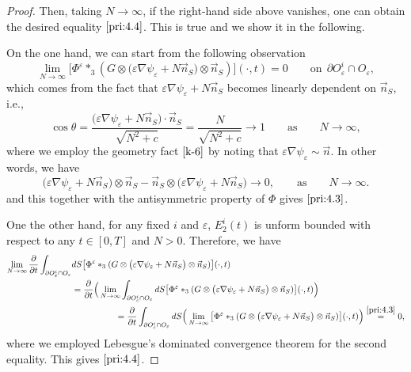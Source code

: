 \documentclass[13pt,CJK]{article}
\theoremstyle{plain}                       %
\theoremstyle{remark}
\numberwithin{equation}{section}
\begin{document}
\begin{proof}
Then, taking $N\to\infty$,
if the right-hand side above vanishes, one can obtain
the desired equality $\eqref{pri:4.4}$. This is true
and we show it in the following.



On the one hand, we can start from the following observation
\begin{equation}\label{pri:4.3}
\lim_{N\to\infty}
  \big[\Phi^\varepsilon\ast_3 (G\otimes
  \big(\varepsilon\nabla\psi_{\varepsilon}+N\vec{n}_S\big)\otimes
  \vec{n}_S)\big](\cdot,t) = 0
  \qquad\text{on}~~\partial O_\varepsilon^i\cap O_\varepsilon,
\end{equation}
which comes from the fact that $\varepsilon\nabla\psi_{\varepsilon}+N\vec{n}_S$  becomes linearly dependent on $\vec{n}_S$, i.e.,
\begin{equation*}
  \cos\theta = \frac{\big(\varepsilon\nabla\psi_\varepsilon+N\vec{n}_S\big)\cdot
  \vec{n}_S}{\sqrt{N^2+c}} = \frac{N}{\sqrt{N^2+c}} \to 1
\qquad\text{as}
\qquad N\to\infty,
\end{equation*}
where we employ the geometry fact $\eqref{k-6}$ by noting that
$\varepsilon\nabla\psi_\varepsilon\sim \vec{n}$.
In other words, we have
\begin{equation*}
\big(\varepsilon\nabla\psi_{\varepsilon}+N\vec{n}_S\big)\otimes
  \vec{n}_S -
  \vec{n}_S\otimes
  \big(\varepsilon\nabla\psi_{\varepsilon}+N\vec{n}_S\big)\to 0,
\qquad\text{as}\qquad N\to\infty.
\end{equation*}
and this together with the antisymmetric property of $\Phi$ gives
$\eqref{pri:4.3}$.

One the other hand, for any fixed $i$ and $\varepsilon$, $E_{2}^i(t)$ is unform bounded with
respect to any $t\in[0,T]$ and $N>0$. Therefore, we have
\begin{equation*}
\begin{aligned}
\lim_{N\to\infty}\frac{\partial}{\partial t}\int_{\partial O_{\varepsilon}^i\cap O_\varepsilon}
&dS
  \big[\Phi^\varepsilon
\ast_3 (G
\otimes
  \big(\varepsilon\nabla\psi_{\varepsilon}
+N\vec{n}_S\big)\otimes
  \vec{n}_S)\big](\cdot,t)\\
&=
\frac{\partial}{\partial t}\Big(
\lim_{N\to\infty}
\int_{\partial O_{\varepsilon}^i\cap O_\varepsilon}dS
  \big[\Phi^\varepsilon\ast_3 (G\otimes
  \big(\varepsilon\nabla\psi_{\varepsilon}+N\vec{n}_S\big)\otimes
  \vec{n}_S)\big](\cdot,t)\Big)\\
&\qquad\qquad\quad=\frac{\partial}{\partial t}
\int_{\partial O_{\varepsilon}^i\cap O_\varepsilon}dS\Big(
\lim_{N\to\infty}
  \big[\Phi^\varepsilon\ast_3 (G\otimes
  \big(\varepsilon\nabla\psi_{\varepsilon}+N\vec{n}_S\big)\otimes
  \vec{n}_S)\big](\cdot,t)\Big) \overset{\eqref{pri:4.3}}{=}0,
\end{aligned}
\end{equation*}
where we employed Lebesgue's dominated convergence theorem
for the second equality. This gives $\eqref{pri:4.4}$.


\end{proof}
\end{document}
